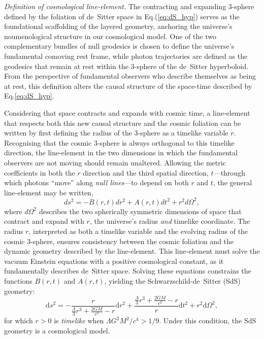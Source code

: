 \documentclass[aps,rmp,groupedaddress,twocolumn,10pt]{revtex4-2}
\begin{document}
\textit{Definition of cosmological line-element.} The contracting and expanding 3-sphere defined by the foliation of de~Sitter space in Eq.(\ref{eq:dS_hyp}) serves as the foundational scaffolding of the layered geometry, anchoring the universe's noumenological structure in our cosmological model. One of the two complementary bundles of null geodesics is chosen to define the universe's fundamental comoving rest frame, while photon trajectories are defined as the geodesics that remain at rest within the 3-sphere of the de~Sitter hyperboloid. From the perspective of fundamental observers who describe themselves as being at rest, this definition alters the causal structure of the space-time described by Eq.\ref{eq:dS_hyp}.

Considering that space contracts and expands with cosmic time, a line-element that respects both this new causal structure and the cosmic foliation can be written by first defining the radius of the 3-sphere as a timelike variable $r$. Recognising that the cosmic 3-sphere is always orthogonal to this timelike direction, the line-element in the two dimensions in which the fundamental observers are not moving should remain unaltered. Allowing the metric coefficients in both the $r$ direction and the third spatial direction, $t$---through which photons ``move'' along \textit{null lines}---to depend on both $r$ and $t$, the general line-element may be written, 
\begin{equation} 
    ds^2=-B(r,t)dr^2+A(r,t)dt^2+r^2d\Omega^2,\label{eq:JB} 
\end{equation} 
where $d\Omega^2$ describes the two spherically symmetric dimensions of space that contract and expand with $r$, the universe's radius \textit{and} timelike coordinate. The radius $r$, interpreted as both a timelike variable and the evolving radius of the cosmic 3-sphere, ensures consistency between the cosmic foliation and the dynamic geometry described by the line-element. This line-element must solve the vacuum Einstein equations with a positive cosmological constant, as it fundamentally describes de~Sitter space. Solving these equations constrains the functions $B(r,t)$ and $A(r,t)$, yielding the Schwarzschild-de~Sitter (SdS) geometry: 
\begin{equation} 
    \mathrm{d}s^2=-\frac{r}{\frac{\Lambda}{3}r^3+\frac{2GM}{c^2}-r}\mathrm{d}r^2+\frac{\frac{\Lambda}{3}r^3+\frac{2GM}{c^2}-r}{r}\mathrm{d}t^2+r^2\mathrm{d}\Omega^2,\label{eq:SdS_statical} 
\end{equation} 
for which $r > 0$ is \textit{timelike} when ${\Lambda}G^2M^2/c^4 > 1/9$. Under this condition, the SdS geometry is a cosmological model.
\end{document}
